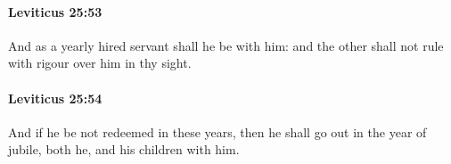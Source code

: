 		\paragraph{Leviticus 25:53} %
			\label{LEVITICUS-25-53}

			And as a yearly hired servant shall he be with him: and the other shall not rule with rigour over him in thy sight.


		\paragraph{Leviticus 25:54} %
			\label{LEVITICUS-25-54}

			And if he be not redeemed in these years, then he shall go out in the year of jubile, both he, and his children with him.


